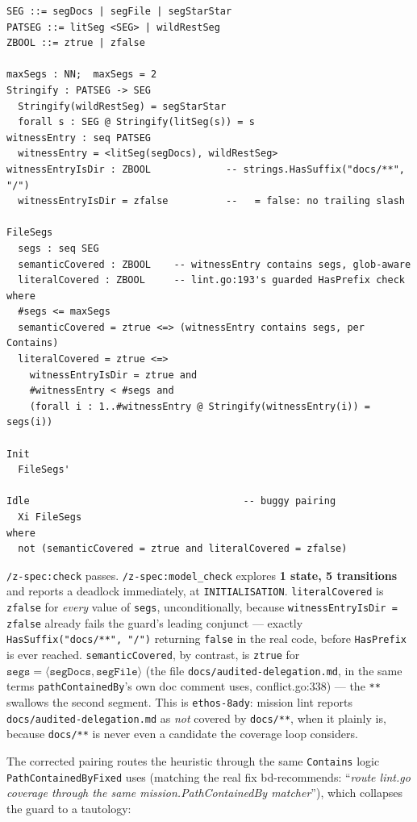 \documentclass[a4paper,10pt,fleqn]{article}
\newcommand{\field}[1]{\texttt{#1}}
\begin{document}
\begin{verbatim}
SEG ::= segDocs | segFile | segStarStar
PATSEG ::= litSeg <SEG> | wildRestSeg
ZBOOL ::= ztrue | zfalse

maxSegs : NN;  maxSegs = 2
Stringify : PATSEG -> SEG
  Stringify(wildRestSeg) = segStarStar
  forall s : SEG @ Stringify(litSeg(s)) = s
witnessEntry : seq PATSEG
  witnessEntry = <litSeg(segDocs), wildRestSeg>
witnessEntryIsDir : ZBOOL             -- strings.HasSuffix("docs/**", "/")
  witnessEntryIsDir = zfalse          --   = false: no trailing slash

FileSegs
  segs : seq SEG
  semanticCovered : ZBOOL    -- witnessEntry contains segs, glob-aware
  literalCovered : ZBOOL     -- lint.go:193's guarded HasPrefix check
where
  #segs <= maxSegs
  semanticCovered = ztrue <=> (witnessEntry contains segs, per Contains)
  literalCovered = ztrue <=>
    witnessEntryIsDir = ztrue and
    #witnessEntry < #segs and
    (forall i : 1..#witnessEntry @ Stringify(witnessEntry(i)) = segs(i))

Init
  FileSegs'

Idle                                     -- buggy pairing
  Xi FileSegs
where
  not (semanticCovered = ztrue and literalCovered = zfalse)
\end{verbatim}

\texttt{/z-spec:check} passes. \texttt{/z-spec:model\_check} explores
\textbf{1 state, 5 transitions} and reports a deadlock immediately,
at \field{INITIALISATION}. \field{literalCovered} is \field{zfalse}
for \emph{every} value of \field{segs}, unconditionally, because
\field{witnessEntryIsDir = zfalse} already fails the guard's leading
conjunct --- exactly \field{HasSuffix("docs/**", "/")} returning
\field{false} in the real code, before \field{HasPrefix} is ever
reached. \field{semanticCovered}, by contrast, is \field{ztrue} for
$\field{segs} = \langle \field{segDocs}, \field{segFile} \rangle$
(the file \texttt{docs/audited-delegation.md}, in the same terms
\field{pathContainedBy}'s own doc comment uses, conflict.go:338)
--- the \texttt{**} swallows the second segment. This is
\field{ethos-8ady}: mission lint reports
\texttt{docs/audited-delegation.md} as \emph{not} covered by
\texttt{docs/**}, when it plainly is, because \field{docs/**} is
never even a candidate the coverage loop considers.

The corrected pairing routes the heuristic through the same
\field{Contains} logic \field{PathContainedByFixed} uses
(matching the real fix bd-recommends: ``\emph{route lint.go coverage
through the same mission.PathContainedBy matcher}''), which collapses
the guard to a tautology:
\end{document}
